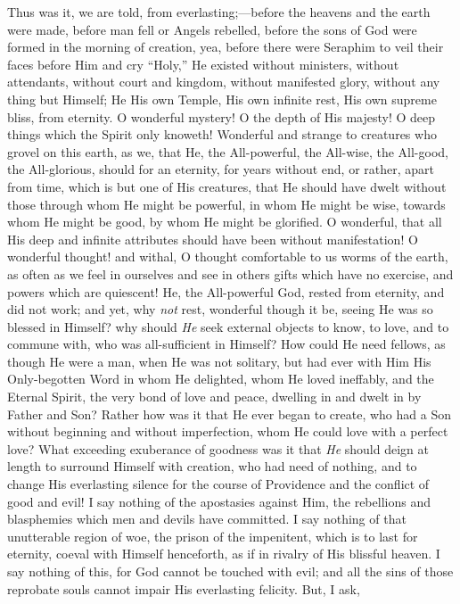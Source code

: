 Thus was it, we are told, from everlasting;—before the heavens
and the earth were made, before man fell or Angels rebelled, before
the sons of God were formed in the morning of creation, yea, before
there were Seraphim to veil their faces before Him and cry
``Holy,'' He existed without ministers, without attendants,
without court and kingdom, without manifested glory, without any thing
but Himself; He His own Temple, His own infinite rest, His own supreme
bliss, from eternity. O wonderful mystery! O the depth of His majesty!
O deep things which the Spirit only knoweth! Wonderful and strange to
creatures who grovel on this earth, as we, that He, the All-powerful,
the All-wise, the All-good, the All-glorious, should for an eternity,
for years without end, or rather, apart from time, which is but one of
His creatures, that He should have dwelt without those through whom He
might be powerful, in whom He might be wise, towards whom He might be
good, by whom He might be glorified. O wonderful, that all His deep
and infinite attributes should have been without manifestation! O
wonderful thought! and withal, O thought comfortable to us worms of
the earth, as often as we feel in ourselves and see in others gifts
which have no exercise, and powers which are quiescent! He, the
All-powerful God, rested from eternity, and did not work; and yet, why
\emph{not} rest, wonderful though it be, seeing He was so blessed in
Himself? why should \emph{He} seek external objects to know, to love,
and to commune with, who was all-sufficient in Himself? How could He
need fellows, as though He were a man, when He was not solitary, but
had ever with Him His Only-begotten Word in whom He delighted, whom He
loved ineffably, and the Eternal Spirit, the very bond of love and
peace, dwelling in and dwelt in by Father and Son? Rather how was it
that He ever began to create, who had a Son without beginning and
without imperfection, whom He could love with a perfect love? What
exceeding exuberance of goodness was it that \emph{He} should deign at
length to surround Himself with creation, who had need of nothing, and
to change His everlasting silence for the course of Providence and the
conflict of good and evil! I say nothing of the apostasies against
Him, the rebellions and blasphemies which men and devils have
committed. I say nothing of that unutterable region of woe, the prison
of the impenitent, which is to last for eternity, coeval with Himself
henceforth, as if in rivalry of His blissful heaven. I say nothing of
this, for God cannot be touched with evil; and all the sins of those
reprobate souls cannot impair His everlasting felicity. But, I ask,
